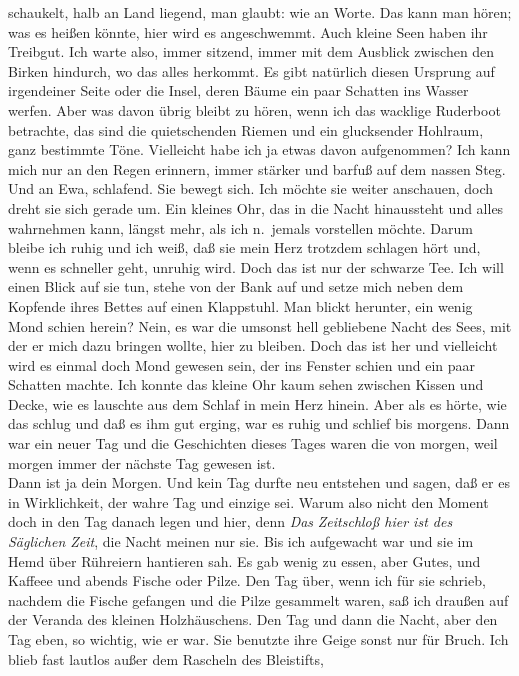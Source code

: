 \documentclass[
]{article}
\begin{document}
schaukelt, halb an Land liegend, man glaubt: wie an Worte. Das kann man
hören; was es heißen könnte, hier wird es angeschwemmt. Auch kleine Seen
haben ihr Treibgut. Ich warte also, immer sitzend, immer mit dem
Ausblick zwischen den Birken hindurch, wo das alles herkommt. Es gibt
natürlich diesen Ursprung auf irgendeiner Seite oder die Insel, deren
Bäume ein paar Schatten ins Wasser werfen. Aber was davon übrig bleibt
zu hören, wenn ich das wacklige Ruderboot betrachte, das sind die
quietschenden Riemen und ein glucksender Hohlraum, ganz bestimmte Töne.
Vielleicht habe ich ja etwas davon aufgenommen? Ich kann mich nur an den
Regen erinnern, immer stärker und barfuß auf dem nassen Steg. Und an
Ewa, schlafend. Sie bewegt sich. Ich möchte sie weiter anschauen, doch
dreht sie sich gerade um. Ein kleines Ohr, das in die Nacht hinaussteht
und alles wahrnehmen kann, längst mehr, als ich n.~jemals vorstellen
möchte. Darum bleibe ich ruhig und ich weiß, daß sie mein Herz trotzdem
schlagen hört und, wenn es schneller geht, unruhig wird. Doch das ist
nur der schwarze Tee. Ich will einen Blick auf sie tun, stehe von der
Bank auf und setze mich neben dem Kopfende ihres Bettes auf einen
Klappstuhl. Man blickt herunter, ein wenig Mond schien herein? Nein, es
war die umsonst hell gebliebene Nacht des Sees, mit der er mich dazu
bringen wollte, hier zu bleiben. Doch das ist her und vielleicht wird es
einmal doch Mond gewesen sein, der ins Fenster schien und ein paar
Schatten machte. Ich konnte das kleine Ohr kaum sehen zwischen Kissen
und Decke, wie es lauschte aus dem Schlaf in mein Herz hinein. Aber als
es hörte, wie das schlug und daß es ihm gut erging, war es ruhig und
schlief bis morgens. Dann war ein neuer Tag und die Geschichten dieses
Tages waren die von morgen, weil morgen immer der nächste Tag gewesen
ist.\\
Dann ist ja dein Morgen. Und kein Tag durfte neu entstehen und sagen,
daß er es in Wirklichkeit, der wahre Tag und einzige sei. Warum also
nicht den Moment doch in den Tag danach legen und hier, denn \emph{Das}
\emph{Zeitschloß hier ist des Säglichen Zeit}, die Nacht meinen nur sie.
Bis ich aufgewacht war und sie im Hemd über Rühreiern hantieren sah. Es
gab wenig zu essen, aber Gutes, und Kaffeee und abends Fische oder
Pilze. Den Tag über, wenn ich für sie schrieb, nachdem die Fische
gefangen und die Pilze gesammelt waren, saß ich draußen auf der Veranda
des kleinen Holzhäuschens. Den Tag und dann die Nacht, aber den Tag
eben, so wichtig, wie er war. Sie benutzte ihre Geige sonst nur für
Bruch. Ich blieb fast lautlos außer dem Rascheln des Bleistifts,
\end{document}
